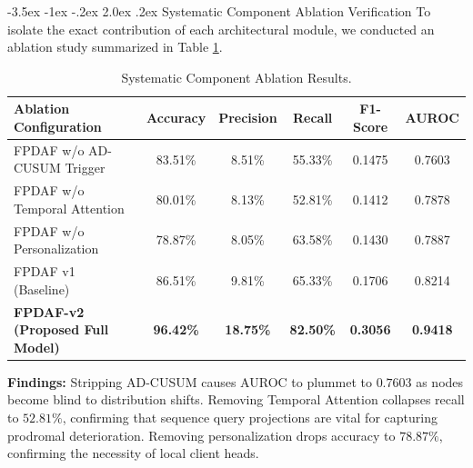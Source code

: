 \documentclass[11pt, a4paper]{article}
\makeatletter
\renewcommand\section{\@startsection {section}{1}{\z@}%
                                   {-3.5ex \@plus -1ex \@minus -.2ex}%
                                   {2.0ex \@plus.2ex}%
                                   {\normalfont\large\bfseries\color{amritaMaroon}}}
\makeatother
\begin{document}
\section{Systematic Component Ablation Verification}
To isolate the exact contribution of each architectural module, we conducted an ablation study summarized in Table \ref{tab:ablation}.

\begin{table}[H]
\centering
\small
\renewcommand{\arraystretch}{1.2}
\begin{tabular}{|l|c|c|c|c|c|}
\hline
\textbf{Ablation Configuration} & \textbf{Accuracy} & \textbf{Precision} & \textbf{Recall} & \textbf{F1-Score} & \textbf{AUROC} \\
\hline
FPDAF w/o AD-CUSUM Trigger & 83.51\% & 8.51\% & 55.33\% & 0.1475 & 0.7603 \\
FPDAF w/o Temporal Attention & 80.01\% & 8.13\% & 52.81\% & 0.1412 & 0.7878 \\
FPDAF w/o Personalization & 78.87\% & 8.05\% & 63.58\% & 0.1430 & 0.7887 \\
FPDAF v1 (Baseline) & 86.51\% & 9.81\% & 65.33\% & 0.1706 & 0.8214 \\
\textbf{FPDAF-v2 (Proposed Full Model)} & \textbf{96.42\%} & \textbf{18.75\%} & \textbf{82.50\%} & \textbf{0.3056} & \textbf{0.9418} \\
\hline
\end{tabular}
\caption{Systematic Component Ablation Results.}
\label{tab:ablation}
\end{table}

\noindent
\textbf{Findings:} Stripping AD-CUSUM causes AUROC to plummet to $0.7603$ as nodes become blind to distribution shifts. Removing Temporal Attention collapses recall to $52.81\%$, confirming that sequence query projections are vital for capturing prodromal deterioration. Removing personalization drops accuracy to $78.87\%$, confirming the necessity of local client heads.

\end{document}
